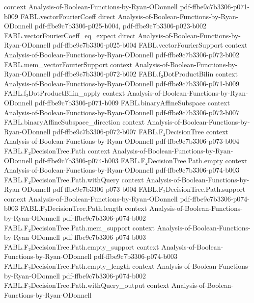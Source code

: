 \begin{theorem}
  {context}
  {Analysis-of-Boolean-Functions-by-Ryan-ODonnell}
  {pdf-ffbe9c7b3306-p071-b009}
\proofstep
  {FABL.vectorFourierCoeff}
  {direct}
  {Analysis-of-Boolean-Functions-by-Ryan-ODonnell}
  {pdf-ffbe9c7b3306-p025-b004,
    pdf-ffbe9c7b3306-p023-b002}
\proofstep
  {FABL.vectorFourierCoeff_eq_expect}
  {direct}
  {Analysis-of-Boolean-Functions-by-Ryan-ODonnell}
  {pdf-ffbe9c7b3306-p025-b004}
\proofstep
  {FABL.vectorFourierSupport}
  {context}
  {Analysis-of-Boolean-Functions-by-Ryan-ODonnell}
  {pdf-ffbe9c7b3306-p072-b002}
\proofstep
  {FABL.mem_vectorFourierSupport}
  {context}
  {Analysis-of-Boolean-Functions-by-Ryan-ODonnell}
  {pdf-ffbe9c7b3306-p072-b002}
\proofstep
  {FABL.f₂DotProductBilin}
  {context}
  {Analysis-of-Boolean-Functions-by-Ryan-ODonnell}
  {pdf-ffbe9c7b3306-p071-b009}
\proofstep
  {FABL.f₂DotProductBilin_apply}
  {context}
  {Analysis-of-Boolean-Functions-by-Ryan-ODonnell}
  {pdf-ffbe9c7b3306-p071-b009}
\proofstep
  {FABL.binaryAffineSubspace}
  {context}
  {Analysis-of-Boolean-Functions-by-Ryan-ODonnell}
  {pdf-ffbe9c7b3306-p072-b007}
\proofstep
  {FABL.binaryAffineSubspace_direction}
  {context}
  {Analysis-of-Boolean-Functions-by-Ryan-ODonnell}
  {pdf-ffbe9c7b3306-p072-b007}
\proofstep
  {FABL.F₂DecisionTree}
  {context}
  {Analysis-of-Boolean-Functions-by-Ryan-ODonnell}
  {pdf-ffbe9c7b3306-p073-b004}
\proofstep
  {FABL.F₂DecisionTree.Path}
  {context}
  {Analysis-of-Boolean-Functions-by-Ryan-ODonnell}
  {pdf-ffbe9c7b3306-p074-b003}
\proofstep
  {FABL.F₂DecisionTree.Path.empty}
  {context}
  {Analysis-of-Boolean-Functions-by-Ryan-ODonnell}
  {pdf-ffbe9c7b3306-p074-b003}
\proofstep
  {FABL.F₂DecisionTree.Path.withQuery}
  {context}
  {Analysis-of-Boolean-Functions-by-Ryan-ODonnell}
  {pdf-ffbe9c7b3306-p073-b004}
\proofstep
  {FABL.F₂DecisionTree.Path.support}
  {context}
  {Analysis-of-Boolean-Functions-by-Ryan-ODonnell}
  {pdf-ffbe9c7b3306-p074-b003}
\proofstep
  {FABL.F₂DecisionTree.Path.length}
  {context}
  {Analysis-of-Boolean-Functions-by-Ryan-ODonnell}
  {pdf-ffbe9c7b3306-p074-b002}
\proofstep
  {FABL.F₂DecisionTree.Path.mem_support}
  {context}
  {Analysis-of-Boolean-Functions-by-Ryan-ODonnell}
  {pdf-ffbe9c7b3306-p074-b003}
\proofstep
  {FABL.F₂DecisionTree.Path.empty_support}
  {context}
  {Analysis-of-Boolean-Functions-by-Ryan-ODonnell}
  {pdf-ffbe9c7b3306-p074-b003}
\proofstep
  {FABL.F₂DecisionTree.Path.empty_length}
  {context}
  {Analysis-of-Boolean-Functions-by-Ryan-ODonnell}
  {pdf-ffbe9c7b3306-p074-b002}
\proofstep
  {FABL.F₂DecisionTree.Path.withQuery_output}
  {context}
  {Analysis-of-Boolean-Functions-by-Ryan-ODonnell}

\end{theorem}
